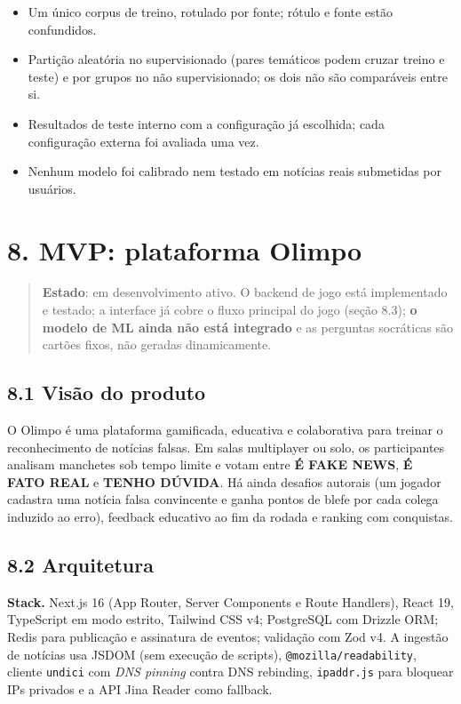 \documentclass[
  brazilian,
  11pt,
]{article}
\providecommand{\tightlist}{%
  \setlength{\itemsep}{0pt}\setlength{\parskip}{0pt}}
\begin{document}
\begin{itemize}
\tightlist
\item
  Um único corpus de treino, rotulado por fonte; rótulo e fonte estão confundidos.
\item
  Partição aleatória no supervisionado (pares temáticos podem cruzar treino e teste) e por grupos no não supervisionado; os dois não são comparáveis entre si.
\item
  Resultados de teste interno com a configuração já escolhida; cada configuração externa foi avaliada uma vez.
\item
  Nenhum modelo foi calibrado nem testado em notícias reais submetidas por usuários.
\end{itemize}

\section{8. MVP: plataforma Olimpo}\label{mvp-plataforma-olimpo}

\begin{quote}
\textbf{Estado}: em desenvolvimento ativo. O backend de jogo está implementado e testado; a interface já cobre o fluxo principal do jogo (seção 8.3); \textbf{o modelo de ML ainda não está integrado} e as perguntas socráticas são cartões fixos, não geradas dinamicamente.
\end{quote}

\subsection{8.1 Visão do produto}\label{visuxe3o-do-produto}

O Olimpo é uma plataforma gamificada, educativa e colaborativa para treinar o reconhecimento de notícias falsas. Em salas multiplayer ou solo, os participantes analisam manchetes sob tempo limite e votam entre \textbf{É FAKE NEWS}, \textbf{É FATO REAL} e \textbf{TENHO DÚVIDA}. Há ainda desafios autorais (um jogador cadastra uma notícia falsa convincente e ganha pontos de blefe por cada colega induzido ao erro), feedback educativo ao fim da rodada e ranking com conquistas.

\subsection{8.2 Arquitetura}\label{arquitetura}

\textbf{Stack.} Next.js 16 (App Router, Server Components e Route Handlers), React 19, TypeScript em modo estrito, Tailwind CSS v4; PostgreSQL com Drizzle ORM; Redis para publicação e assinatura de eventos; validação com Zod v4. A ingestão de notícias usa JSDOM (sem execução de scripts), \texttt{@mozilla/readability}, cliente \texttt{undici} com \emph{DNS pinning} contra DNS rebinding, \texttt{ipaddr.js} para bloquear IPs privados e a API Jina Reader como fallback.
\end{document}
